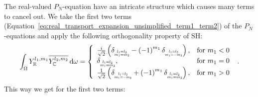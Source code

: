 \documentclass{egpubl}
\newcommand{\ud}{\,\mathrm{d}} %
\newcommand{\SHBR}{Y_{\mathbb{R}}} %
\newcommand{\SHBC}{Y_{\mathbb{C}}} %
\begin{document}
The real-valued $P_N$-equation have an intricate structure which causes many terms to cancel out. We take the first two terms (Equation~\ref{eq:real_transport_expansion_unsimplified_term1_term2}) of the $P_N$-equations and apply the following orthogonality property of SH:
\begin{align}
\int_\Omega{\SHBR^{l_1, m_1}\overline{\SHBC^{l_2, m_2}}}\ud\omega
=
\left\{
\begin{array}{lr}
\frac{i}{\sqrt{2}}
\left(
\delta_{\scaleto{\substack{l_1=l_2\\m_1=m_2}}{9pt}}
-\left({-1}\right)^{m_1}
\delta_{\scaleto{\substack{l_1=l_2\\m_1=-m_2}}{9pt}}
\right)
, & \text{for } m_1 < 0
\\
\delta_{\scaleto{\substack{l_1=l_2\\m_1=m_2}}{9pt}}, & \text{for } m_1 = 0
\\
\frac{1}{\sqrt{2}}
\left(
\delta_{\scaleto{\substack{l_1=l_2\\m_1=-m_2}}{9pt}}
+\left({-1}\right)^{m_1}
\delta_{\scaleto{\substack{l_1=l_2\\m_1=m_2}}{9pt}}
\right)
, & \text{for } m_1 > 0
\end{array}
\right.  \ .
\label{eq:real_orthogonality_property_with_complex}
\end{align}
This way we get for the first two terms:
\end{document}
